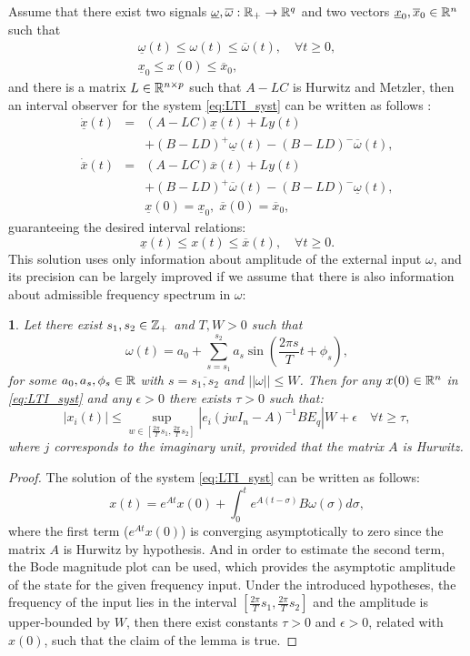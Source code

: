 \documentclass[twocolumn,english]{IEEEtran}
\theoremstyle{plain}
\newtheorem{lem}{\protect\lemmaname}
\theoremstyle{definition}
\theoremstyle{plain}
\theoremstyle{plain}
\theoremstyle{remark}
\providecommand{\lemmaname}{Lemma}
\begin{document}
Assume that there exist two signals $\underline{\omega},\overline{\omega}:\mathbb{R}_{+}\to\mathbb{R}^{q}$ and two vectors $\underline{x}_{0},\overline{x}_{0}\in\mathbb{R}^{n}$ such that
\begin{gather*}
\underline{\omega}(t)\leq\omega(t)\leq\overline{\omega}(t),\quad\forall t\geq0,\\
\underline{x}_{0}\leq x(0)\leq\overline{x}_{0},
\end{gather*} and there is a matrix $L\in\mathbb{R}^{n\times p}$ such that $A-LC$ is Hurwitz and Metzler, then an interval observer for the system \eqref{eq:LTI_syst} can be written as follows \cite{REZ11}:
\begin{eqnarray}
\dot{\underline{x}}(t) & = & (A-LC)\underline{x}(t)+Ly(t)\nonumber \\
 &  & +(B-LD)^{+}\underline{\omega}(t)-(B-LD)^{-}\overline{\omega}(t),\nonumber \\
\dot{\overline{x}}(t) & = & (A-LC)\overline{x}(t)+Ly(t)\label{eq:IO_LTI}\\
 &  & +(B-LD)^{+}\overline{\omega}(t)-(B-LD)^{-}\underline{\omega}(t),\nonumber \\
 &  & \underline{x}(0)=\underline{x}_{0},\;\overline{x}(0)=\overline{x}_{0},\nonumber 
\end{eqnarray}
guaranteeing the desired interval relations:
\[
\underline{x}(t)\leq x(t)\leq\overline{x}(t),\quad\forall t\geq0.
\]
This solution uses only information about amplitude of the external input $\omega$, and its precision can be largely improved if we assume that there is also information about admissible frequency spectrum in $\omega$:
\begin{lem}
\label{lem:IntFreq} Let there exist $s_{1},s_{2}\in\mathbb{Z}_{+}$ and $T,W>0$
such that
\[
\omega(t)=a_{0}+\sum_{s=s_{1}}^{s_{2}}a_{s}\sin\left(\frac{2\pi s}{T}t+\phi_{s}\right),
\]
for some $a_{0},a_{s},\phi_{s}\in\mathbb{R}$ with $s=\overline{s_{1},s_{2}}$ and $||\omega||\leq W$. Then for any $x(0)\in\mathbb{R}^{n}$ in \eqref{eq:LTI_syst} and any $\epsilon>0$ there exists $\tau>0$ such that:
\[
|x_{i}(t)|\leq\sup_{w\in[\frac{2\pi}{T}s_{1},\frac{2\pi}{T}s_{2}]}|e_{i}(jwI_{n}-A)^{-1}BE_{q}|W+\epsilon\quad\forall t\geq\tau,
\]
where $j$ corresponds to the imaginary unit, provided that the matrix $A$ is Hurwitz.
\end{lem}
\begin{proof}
The solution of the system \eqref{eq:LTI_syst} can be written as follows:
\[
x(t)=e^{At}x(0)+\int_{0}^{t}e^{A(t-\sigma)}B\omega(\sigma)d\sigma,
\]
where the first term ($e^{At}x(0)$) is converging asymptotically to zero since the matrix $A$ is Hurwitz by hypothesis. And in order to estimate the second term, the Bode magnitude plot can be used, which provides the asymptotic amplitude of the state for the given frequency input. Under the introduced hypotheses, the frequency of the input lies in the interval $[\frac{2\pi}{T}s_{1},\frac{2\pi}{T}s_{2}]$ and the amplitude is upper-bounded by $W$, then there exist constants $\tau>0$ and $\epsilon>0$, related with $x(0)$, such that the claim of the lemma is true.
\end{proof}
\end{document}
